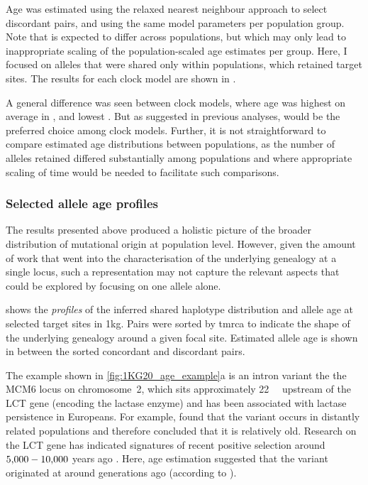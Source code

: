 Age was estimated using the relaxed nearest neighbour approach to select discordant pairs, and using the same model parameters per population group.
Note that \Ne is expected to differ across populations, but which may only lead to inappropriate scaling of the population-scaled age estimates per group.
Here, I focused on alleles that were shared only within populations, which retained  target sites.
The results for each clock model are shown in .

%

%

A general difference was seen between clock models, where age was highest on average in \ClockM, and lowest \ClockR.
But as suggested in previous analyses, \ClockC would be the preferred choice among clock models.
Further, it is not straightforward to compare estimated age distributions between populations, as the number of alleles retained differed substantially among populations and where appropriate scaling of time would be needed to facilitate such comparisons.


%
\subsubsection{Selected allele age profiles}
%

The results presented above produced a holistic picture of the broader distribution of mutational origin at population level.
However, given the amount of work that went into the characterisation of the underlying genealogy at a single locus, such a representation may not capture the relevant aspects that could be explored by focusing on one allele alone.

%

%

 shows the \emph{profiles} of the inferred shared haplotype distribution and allele age at  selected target sites in \gls{1kg}.
Pairs were sorted by \gls{tmrca} to indicate the shape of the underlying genealogy around a given focal site.
Estimated allele age is shown in between the sorted concordant and discordant pairs.

The example shown in \cref{fig:1KG20_age_example}{a} is an intron variant the the MCM6 locus on chromosome~2, which sits approximately \SI{22}{\kilo\basepair} upstream of the LCT gene (encoding the lactase enzyme) and has been associated with lactase persistence in Europeans.
For example, \citet{enattah2002identification} found that the variant occurs in distantly related populations and therefore concluded that it is relatively old.
Research on the LCT gene has indicated signatures of recent positive selection around ${\n{5000}-\n{10000}}$ years ago \citep{bersaglieri2004genetic}.
Here, age estimation suggested that the variant originated at around  generations ago (according to \ClockC).

